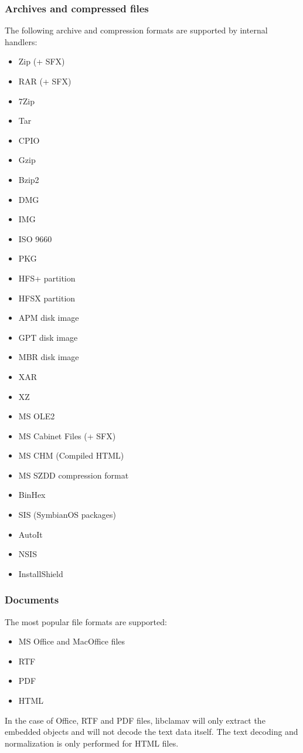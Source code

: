 \documentclass[a4paper,titlepage,12pt]{article}
\begin{document}
    \subsubsection{Archives and compressed files}
    The following archive and compression formats are supported by internal
    handlers:
    \begin{itemize}
	\item Zip (+ SFX)
	\item RAR (+ SFX)
	\item 7Zip
	\item Tar
	\item CPIO
	\item Gzip
	\item Bzip2
        \item DMG
        \item IMG
        \item ISO 9660
        \item PKG
        \item HFS+ partition
        \item HFSX partition
        \item APM disk image
        \item GPT disk image
        \item MBR disk image
        \item XAR
        \item XZ
	\item MS OLE2
	\item MS Cabinet Files (+ SFX)
	\item MS CHM (Compiled HTML)
	\item MS SZDD compression format
	\item BinHex
	\item SIS (SymbianOS packages)
	\item AutoIt
	\item NSIS
	\item InstallShield
    \end{itemize}

    \subsubsection{Documents}
    The most popular file formats are supported:
    \begin{itemize}
	\item MS Office and MacOffice files
	\item RTF
	\item PDF
	\item HTML
    \end{itemize}
    In the case of Office, RTF and PDF files, libclamav will only extract the
    embedded objects and will not decode the text data itself. The text
    decoding and normalization is only performed for HTML files.
\end{document}
